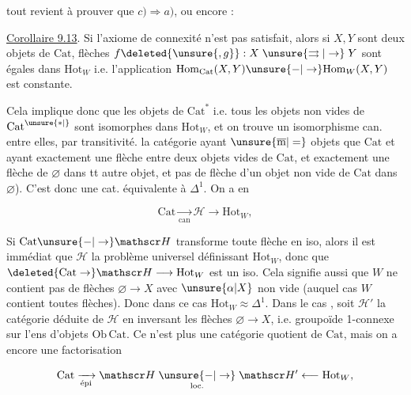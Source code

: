 
tout revient à prouver que $c)\Rightarrow a)$, ou encore :

\uline{Corollaire 9.13}. Si l'axiome de connexité n'est pas
satisfait, alors  si $X,Y$ sont deux objets de $\mathrm{Cat}$,
  flèches $f\deleted{\unsure{,g}}:X\mathrel{\unsure{\rightrightarrows|\to}}Y$  sont  égales dans
$\mathrm{Hot}_{W}$ i.e. l'application $\mathrm{Hom}_{\mathrm{Cat}}(X,Y)\unsure{-|\to}\mathrm{Hom}_{W}(X,Y)$ est
constante.

Cela implique donc que  les objets de $\mathrm{Cat}^*$ i.e.
tous les objets non vides de $\mathrm{Cat}^{\unsure{*|{}}}$ sont isomorphes
dans $\mathrm{Hot}_{W}$, et on trouve un isomorphisme can.
entre elles,  par transitivité. 
  la catégorie  ayant $\unsure{\overline{\mathrm m}|=}$ objets que $\mathrm{Cat}$
et ayant exactement une flèche entre deux objets
 vides de $\mathrm{Cat}$, et exactement une flèche de $\varnothing$
dans tt autre objet, et pas de flèche d'un objet
non vide de $\mathrm{Cat}$ dans $\varnothing$). C'est donc une cat. équivalente
à $\Delta^1$. On a  
en

\[
 \mathrm{Cat}\xrightarrow[\mathrm{can}]{}\mathscr H\longrightarrow\mathrm{Hot}_{W},
\]

 Si  $\mathrm{Cat}\unsure{-|\to}\mathscr H$ transforme toute flèche 
en iso, alors il est immédiat que $\mathscr H$  
la   problème universel définissant
$\mathrm{Hot}_{W}$, donc que $\deleted{\mathrm{Cat}\to}\mathscr H\longrightarrow\mathrm{Hot}_{W}$ est un iso.
Cela signifie aussi que  $W$ ne contient pas
de flèches $\varnothing\to X$ avec $\unsure{\alpha|X}$ non vide (auquel
cas $W$ contient toutes  flèches). Donc
dans ce cas $\mathrm{Hot}_{W}\approx\Delta^1$. Dans le cas ,
 soit $\mathscr H'$ la catégorie déduite de $\mathscr H$ en inversant
les flèches $\varnothing\longrightarrow X$, i.e.  groupoïde
1-connexe sur l'ens d'objets $\mathrm{Ob}\,\mathrm{Cat}$. Ce n'est
plus une catégorie quotient de $\mathrm{Cat}$, mais
on a encore une factorisation

\[
 \mathrm{Cat}\xrightarrow[\text{épi}]{}\mathscr H
 \mathrel{\mathop{\unsure{-|\to}}\limits_{\mathrm{loc.}}}\mathscr H'
 \longleftarrow\mathrm{Hot}_{W},
\]
